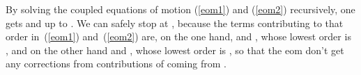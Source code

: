 \documentclass[a4paper,11pt]{article}
\begin{document}
By solving the coupled equations of motion (\ref{eom1}) and (\ref{eom2}) recursively, 
one gets \coordHE{} and \myHighlight{$\phi $}\coordHE{} up to \coordHE{}. 
We can safely stop at \coordHE{}, because the terms contributing to that order
in~(\ref{eom1}) and~(\ref{eom2}) are, on the one hand, 
\coordHE{} and 
\coordHE{}, whose lowest order
is \coordHE{}, and on the other hand \coordHE{} and \coordHE{}, whose lowest order is \coordHE{}, so that the eom don't get 
any corrections from contributions of \coordHE{} coming from \coordHE{}.
\end{document}
